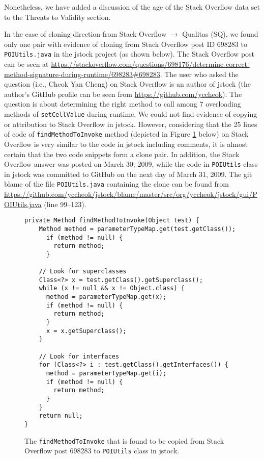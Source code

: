 \documentclass[a4paper,twoside,10pt]{reviewresponse}
\begin{document}
Nonetheless, we have added a discussion of the age of the Stack Overflow data set to the Threats to Validity section.


In the case of cloning direction from Stack Overflow $\rightarrow$ Qualitas
(SQ), we found only one pair with evidence of cloning from Stack Overflow post
ID 698283 to {\small\texttt{POIUtils.java}} in the \textsf{jstock} project (as shown below). 
The Stack Overflow post can be seen at \url{https://stackoverflow.com/questions/698176/determine-correct-method-signature-during-runtime/698283#698283}.
The user who asked the question (i.e., Cheok Yan Cheng) on Stack Overflow is an author of \textsf{jstock} (the author's GitHub profile can be seen from \url{https://github.com/yccheok}). The
question is about determining the right method to call among 7 overloading
methods of {\small\texttt{setCellValue}} during runtime. We could not find
evidence of copying or attribution to Stack Overflow in \textsf{jstock}.
However, considering that the 25 lines of code of
{\small\texttt{findMethodToInvoke}} method (depicted in Figure \ref{fig:jstock_code} below) on Stack Overflow is
very similar to the code in \textsf{jstock} including comments, it is almost
certain that the two code snippets form a clone pair. In addition, the Stack
Overflow answer was posted on March 30, 2009, while the code in
{\small\texttt{POIUtils}} class in \textsf{jstock} was committed to GitHub on
the next day of March 31, 2009. 
The git blame of the file \texttt{POIUtils.java} 
containing the clone can be found from \url{https://github.com/yccheok/jstock/blame/master/src/org/yccheok/jstock/gui/POIUtils.java} (line 99--123).

\begin{figure}[H]
	\begin{lstlisting}
private Method findMethodToInvoke(Object test) {
	Method method = parameterTypeMap.get(test.getClass());
	  if (method != null) {
	    return method;
	  }
	
	// Look for superclasses
	Class<?> x = test.getClass().getSuperclass();
	while (x != null && x != Object.class) {
	  method = parameterTypeMap.get(x);
	  if (method != null) {
	    return method;
	  }
	  x = x.getSuperclass();
	}
	
	// Look for interfaces
	for (Class<?> i : test.getClass().getInterfaces()) {
	  method = parameterTypeMap.get(i);
	  if (method != null) {
	    return method;
	  }
	}
	return null;
}
	\end{lstlisting}
	\caption{The {\small\texttt{findMethodToInvoke}} that is found to be copied from Stack Overflow post 698283 to {\small\texttt{POIUtils}} class in \textsf{jstock}.}
	\label{fig:jstock_code}
\end{figure}
\end{document}
